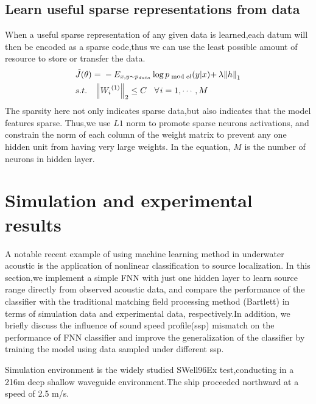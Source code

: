 \subsection{Learn useful sparse representations from data}
When a useful sparse representation of any given data is learned,each datum will then be encoded as a sparse code,thus we can use the least possible amount of resource to store or transfer the data.
\begin{equation}
\begin{split}
&\tilde J(\theta ){\kern 1pt} {\kern 1pt} {\kern 1pt} {\rm{ = }}{\kern 1pt} {\kern 1pt} {\kern 1pt}  - {E_{x,y \sim {p_{data}}}}\log {p_{\bmod el}}(y|x){\rm{ + }}{\kern 1pt} {\kern 1pt} \lambda {\left\| h \right\|_1}\\
& s.t.{\kern 1pt} {\kern 1pt} {\kern 1pt} {\kern 1pt} {\kern 1pt} {\kern 1pt} {\kern 1pt} {\kern 1pt} {\kern 1pt} {\kern 1pt} {\left\| {{W_i}^{(1)}} \right\|_2} \le C{\kern 1pt} {\kern 1pt} {\kern 1pt} {\kern 1pt} {\kern 1pt} {\kern 1pt} {\kern 1pt} {\kern 1pt} {\kern 1pt} \forall {\kern 1pt} i = 1, \cdots ,M\\
\end{split}
\end{equation}
The sparsity here not only indicates sparse data,but also indicates that the model features sparse. Thus,we use $L1$ norm to promote sparse neurons activations, and constrain the norm of each column of the weight matrix to prevent any one hidden unit from having very large weights. In the equation, $M$ is the number of neurons in hidden layer.

\section{Simulation and experimental results}
A notable recent example of using machine learning method in underwater acoustic is the application of nonlinear classification to source localization\cite{niu2017source}.
In this section,we implement a simple FNN with just one hidden layer to learn source range directly from observed acoustic data,
and compare the performance of the classifier with the traditional matching field processing method (Bartlett) in terms of simulation data and experimental data, respectively.In addition, we briefly discuss the influence of sound speed profile(ssp) mismatch on the performance of FNN classifier and improve the generalization of the classifier by training the model using data sampled under different ssp.

Simulation environment is the widely studied SWell96Ex test,conducting in a 216m deep shallow waveguide environment.The ship proceeded northward at a speed of 2.5 m/s.

